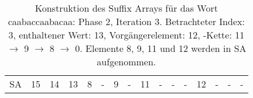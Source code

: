 \begin{table}[H]
\begin{adjustbox}{max width=\textwidth}
\begin{tabular}{lccccccccccccccc}
\multicolumn{1}{l|}{SA}      & \multicolumn{1}{c|}{15} & 14 & \multicolumn{1}{c|}{\cellcolor[HTML]{\green}13} & \multicolumn{1}{c|}{\cellcolor[HTML]{\red}8} & \multicolumn{1}{c|}{-}      & \multicolumn{1}{c|}{\cellcolor[HTML]{\red}9} & \multicolumn{1}{c|}{-}     & \multicolumn{1}{c|}{\cellcolor[HTML]{\red}11} & \multicolumn{1}{c|}{-}   & -  & \multicolumn{1}{c|}{-}  & \cellcolor[HTML]{\red}12 & -  & -  & - 
\end{tabular}
\end{adjustbox}

\caption[Konstruktion des Suffix Arrays für das Wort caabaccaabacaa: Phase 2, Iteration 3]{Konstruktion des Suffix Arrays für das Wort caabaccaabacaa: Phase 2, Iteration 3. Betrachteter Index: 3, enthaltener Wert: 13, Vorgängerelement: 12, \prevpointer-Kette: 11 $\rightarrow$ 9 $\rightarrow$ 8 $\rightarrow$ 0. Elemente 8, 9, 11 und 12 werden in SA aufgenommen.}
\label{table_complex_example_2_3} 
\end{table}

